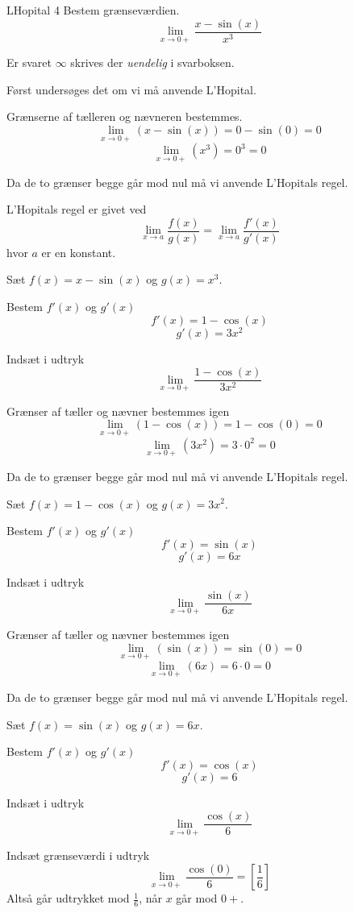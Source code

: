 \documentclass{article}
\begin{document}
\begin{exercise}{LHopital 4}
Bestem grænseværdien.
\[
\lim_{x \to 0+} \frac{x - \sin(x)}{x^3}
\] 

Er svaret $\infty$ skrives der \emph{uendelig} i svarboksen.


\hint
Først undersøges det om vi må anvende L'Hopital.

\hint
Grænserne af tælleren og nævneren bestemmes.
\[
\lim_{x \to 0+} (x - \sin(x)) = 0 - \sin(0) =  0
\]
\[
\lim_{x \to 0+} (x^3) = 0^3 = 0
\]

\hint
Da de to grænser begge går mod nul må vi  anvende L'Hopitals regel. 

\hint
L'Hopitals regel er givet ved
\[
\lim_{x \to a} \frac{f(x)}{g(x)} = \lim_{x \to a} \frac{f'(x)}{g'(x)} 
\]
hvor $a$ er en konstant.

\hint
Sæt $f(x) = x - \sin(x)$ og $g(x) = x^3$. 

\hint
Bestem $f'(x)$ og $g'(x)$
\[
	f'(x) = 1 - \cos(x) 
\]
\[
	g'(x) = 3x^2
\]

\hint
Indsæt i udtryk
\[
\lim_{x \to 0+} \frac{1 - \cos(x)}{3x^2} 
\]

\hint
Grænser af tæller og nævner bestemmes igen
\[
\lim_{x \to 0+} (1 - \cos(x)) = 1 - \cos(0) =  0 
\]
\[
\lim_{x \to 0+} (3x^2) = 3 \cdot 0^2 = 0
\]

\hint
Da de to grænser begge går mod nul må vi  anvende L'Hopitals regel. 

\hint
Sæt $f(x) = 1 - \cos(x)$ og $g(x) = 3x^2$. 

\hint
Bestem $f'(x)$ og $g'(x)$
\[
	f'(x) =  \sin(x)
\]
\[
	g'(x) = 6x
\]

\hint
Indsæt i udtryk
\[
\lim_{x \to 0+} \frac{\sin(x)}{6x} 
\]

\hint
Grænser af tæller og nævner bestemmes igen
\[
\lim_{x \to 0+} (\sin(x)) = \sin(0) =  0 
\]
\[
\lim_{x \to 0+} (6x) = 6 \cdot 0 = 0
\]

\hint
Da de to grænser begge går mod nul må vi  anvende L'Hopitals regel. 

\hint
Sæt $f(x) = \sin(x)$ og $g(x) = 6x$. 

\hint
Bestem $f'(x)$ og $g'(x)$
\[
	f'(x) =  \cos(x)
\]
\[
	g'(x) = 6
\]

\hint
Indsæt i udtryk
\[
\lim_{x \to 0+} \frac{\cos(x)}{6} 
\]

\hint
Indsæt grænseværdi i udtryk
\[
\lim_{x \to 0+} \frac{\cos(0)}{6}  = \left[ \frac{1}{6}  \right] 
\]
Altså går udtrykket mod $\frac{1}{6}$, når $x$ går mod $0+$. 

\end{exercise}
\end{document}
